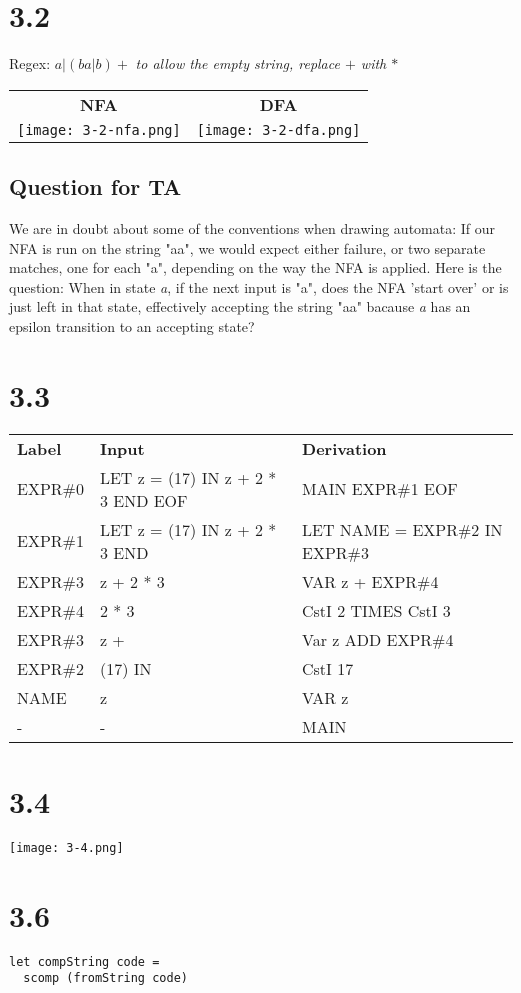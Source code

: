 \documentclass{article}
\begin{document}
\section*{3.2}

Regex: $a|(ba|b)+$
\newline\textit{to allow the empty string, replace $+$ with $*$}

\vspace{10 mm}

\begin{tabular}{c c}
\textbf{NFA} & \textbf{DFA} \\
\texttt{[image: 3-2-nfa.png]} &
	\texttt{[image: 3-2-dfa.png]}
\end{tabular}
\subsection*{Question for TA}
We are in doubt about some of the conventions when drawing automata:
If our NFA is run on the string "aa", we would expect either failure, or
two separate matches, one for each "a", depending on the way the NFA is applied.
Here is the question: When in state \emph{a}, if the next input is "a", does the
NFA 'start over' or is just left in that state, effectively accepting the string
"aa" bacause \emph{a} has an epsilon transition to an accepting state?

\section*{3.3}

\begin{tabular}{l l l}
\textbf{Label} & \textbf{Input} & \textbf{Derivation} \\
EXPR\#0 & LET z = (17) IN z + 2 * 3 END EOF & MAIN EXPR\#1 EOF \\
EXPR\#1 & LET z = (17) IN z + 2 * 3 END & LET NAME = EXPR\#2 IN EXPR\#3 \\
EXPR\#3 & z + 2 * 3 & VAR z + EXPR\#4 \\
EXPR\#4 & 2 * 3 & CstI 2 TIMES CstI 3 \\
EXPR\#3 & z + & Var z ADD EXPR\#4 \\
EXPR\#2 & (17) IN & CstI 17 \\
NAME    & z & VAR z \\
-       & - & MAIN

\end{tabular}

\section*{3.4}

\texttt{[image: 3-4.png]}

\section*{3.6}

\begin{verbatim}
let compString code =
  scomp (fromString code)
\end{verbatim}
\end{document}
